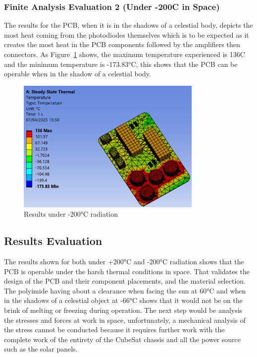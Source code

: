 \subsubsection{Finite Analysis Evaluation 2 (Under -200C in Space)}

The results for the PCB, when it is in the shadows of a celestial body, depicts the most heat coming from the photodiodes themselves which is to be expected as it creates the most heat in the PCB components followed by the amplifiers then connectors. As Figure~\ref{fig:results_minus_200C}  shows, the maximum temperature experienced is 136C and the minimum temperature is -173.83°C, this shows that the PCB can be operable when in the shadow of a celestial body.

\begin{figure}[H]
    \centering
    \includegraphics[width=0.8\textwidth]{chapters/methodology/ThermalAnalysis/Fig3underneg200c.png}
    \caption{Results under -200°C radiation}
    \label{fig:results_minus_200C}
\end{figure}

\subsection{Results Evaluation}

The results shown for both under +200°C and -200°C radiation shows that
the PCB is operable under the harsh thermal conditions in space. That
validates the design of the PCB and their component placements, and the
material selection. The polyimide having about a clearance when facing
the sun at 60°C and when in the shadows of a celestial object at -66°C
shows that it would not be on the brink of melting or freezing during
operation. The next step would be analysis the stresses and forces at
work in space, unfortunately, a mechanical analysis of the stress cannot
be conducted because it requires further work with the complete work of
the entirety of the CubeSat chassis and all the power source such as the
solar panels.
